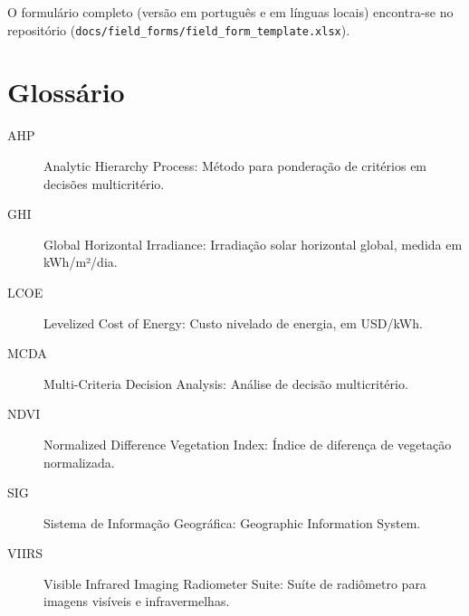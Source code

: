 \documentclass[12pt, a4paper]{article}
\begin{document}
O formulário completo (versão em português e em línguas locais) encontra-se no repositório (\texttt{docs/field\_forms/field\_form\_template.xlsx}).

\section*{Glossário}

\begin{description}
\item[AHP] Analytic Hierarchy Process: Método para ponderação de critérios em decisões multicritério.
\item[GHI] Global Horizontal Irradiance: Irradiação solar horizontal global, medida em kWh/m²/dia.
\item[LCOE] Levelized Cost of Energy: Custo nivelado de energia, em USD/kWh.
\item[MCDA] Multi-Criteria Decision Analysis: Análise de decisão multicritério.
\item[NDVI] Normalized Difference Vegetation Index: Índice de diferença de vegetação normalizada.
\item[SIG] Sistema de Informação Geográfica: Geographic Information System.
\item[VIIRS] Visible Infrared Imaging Radiometer Suite: Suíte de radiômetro para imagens visíveis e infravermelhas.
\end{description}

\clearpage
\


\end{document}
